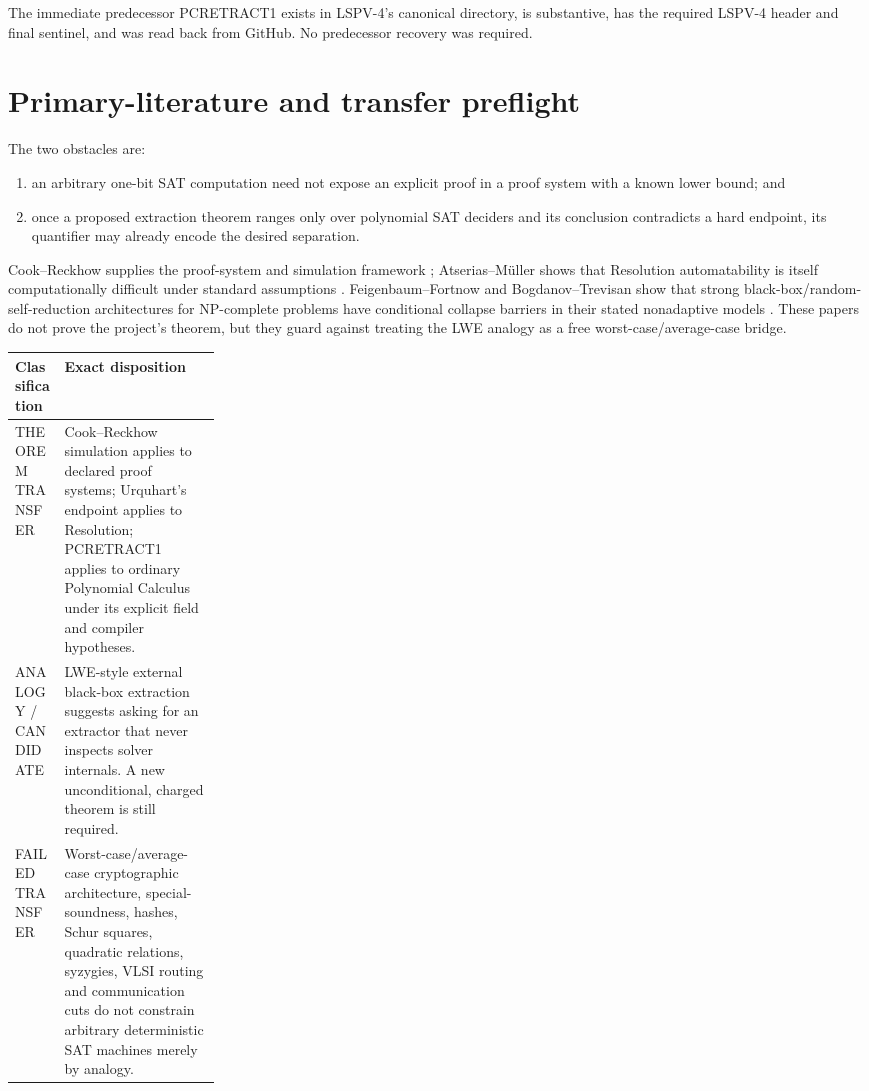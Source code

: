 \documentclass[11pt]{article}
\begin{document}
The immediate predecessor PCRETRACT1 exists in LSPV-4's canonical directory,
is substantive, has the required LSPV-4 header and final sentinel, and was
read back from GitHub.  No predecessor recovery was required.

\section{Primary-literature and transfer preflight}
The two obstacles are:
\begin{enumerate}
\item an arbitrary one-bit SAT computation need not expose an explicit proof
in a proof system with a known lower bound; and
\item once a proposed extraction theorem ranges only over polynomial SAT
deciders and its conclusion contradicts a hard endpoint, its quantifier may
already encode the desired separation.
\end{enumerate}
Cook--Reckhow supplies the proof-system and simulation framework
\cite{CookReckhow}; Atserias--M\"uller shows that Resolution automatability is
itself computationally difficult under standard assumptions
\cite{AtseriasMuller}.  Feigenbaum--Fortnow and Bogdanov--Trevisan show that
strong black-box/random-self-reduction architectures for NP-complete problems
have conditional collapse barriers in their stated nonadaptive models
\cite{FeigenbaumFortnow,BogdanovTrevisan}.  These papers do not prove the
project's theorem, but they guard against treating the LWE analogy as a free
worst-case/average-case bridge.

\begin{center}
\begin{tabularx}{0.96\linewidth}{@{}p{0.24\linewidth}X@{}}
\toprule
Classification & Exact disposition\\
\midrule
THEOREM TRANSFER & Cook--Reckhow simulation applies to declared proof systems;
Urquhart's endpoint applies to Resolution; PCRETRACT1 applies to ordinary
Polynomial Calculus under its explicit field and compiler hypotheses.\\
ANALOGY / CANDIDATE & LWE-style external black-box extraction suggests asking
for an extractor that never inspects solver internals.  A new unconditional,
charged theorem is still required.\\
FAILED TRANSFER & Worst-case/average-case cryptographic architecture,
special-soundness, hashes, Schur squares, quadratic relations, syzygies,
VLSI routing and communication cuts do not constrain arbitrary deterministic
SAT machines merely by analogy.\\
\bottomrule
\end{tabularx}
\end{center}
\end{document}

